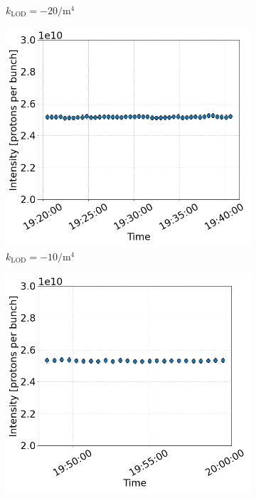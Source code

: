 \begin{figure}[htp]
\begin{subfigure}{.45\textwidth}
        \caption{$k_\mathrm{LOD}=-20 \mathrm{/m^{4}}$}
    \end{subfigure}
    \begin{subfigure}{.45\textwidth}
        \centering
        \includegraphics[width=.95\linewidth]{images/app_e/intensity_cc_md_12Sep22_coast_8.png}  
        \caption{$k_\mathrm{LOD}=-10 \mathrm{/m^{4}}$}
    \end{subfigure}
    \begin{subfigure}{.45\textwidth}
            \centering
            \includegraphics[width=.95\linewidth]{images/app_e/intensity_cc_md_12Sep22_coast_9.png}  

\end{subfigure}
\end{figure}
